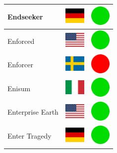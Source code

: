 \documentclass[12pt, a4paper, twoside]{report}
\begin{document}
\begin{center}
\begin{longtable}{|p{5cm}|p{2cm}|p{2cm}|}
 Endseeker                                                  & \includegraphics[width=1cm]{../4x3/de} &   \includegraphics[width=1cm]{../likes/y} \\ \hline
 Enforced                                                   & \includegraphics[width=1cm]{../4x3/us} &   \includegraphics[width=1cm]{../likes/y} \\ \hline
 Enforcer                                                   & \includegraphics[width=1cm]{../4x3/se} &   \includegraphics[width=1cm]{../likes/n} \\ \hline
 Enisum                                                     & \includegraphics[width=1cm]{../4x3/it} &   \includegraphics[width=1cm]{../likes/y} \\ \hline
 Enterprise Earth                                           & \includegraphics[width=1cm]{../4x3/us} &   \includegraphics[width=1cm]{../likes/y} \\ \hline
 Enter Tragedy                                              & \includegraphics[width=1cm]{../4x3/de} &   \includegraphics[width=1cm]{../likes/y} \\ \hline

\end{longtable}
\end{center}
\end{document}
